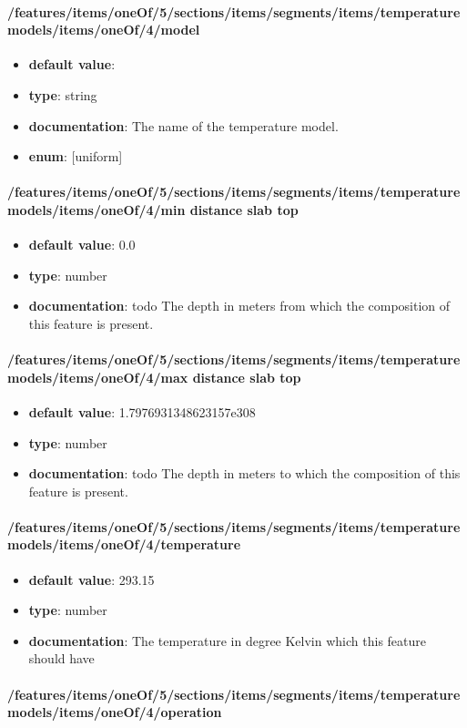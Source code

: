 \paragraph{/features/items/oneOf/5/sections/items/segments/items/temperature models/items/oneOf/4/model}
\begin{itemize}\item {\bf default value}: 
\item {\bf type}: string
\item {\bf documentation}: The name of the temperature model.
\item {\bf enum}: [uniform]\end{itemize}\paragraph{/features/items/oneOf/5/sections/items/segments/items/temperature models/items/oneOf/4/min distance slab top}
\begin{itemize}\item {\bf default value}: 0.0
\item {\bf type}: number
\item {\bf documentation}: todo The depth in meters from which the composition of this feature is present.
\end{itemize}\paragraph{/features/items/oneOf/5/sections/items/segments/items/temperature models/items/oneOf/4/max distance slab top}
\begin{itemize}\item {\bf default value}: 1.7976931348623157e308
\item {\bf type}: number
\item {\bf documentation}: todo The depth in meters to which the composition of this feature is present.
\end{itemize}\paragraph{/features/items/oneOf/5/sections/items/segments/items/temperature models/items/oneOf/4/temperature}
\begin{itemize}\item {\bf default value}: 293.15
\item {\bf type}: number
\item {\bf documentation}: The temperature in degree Kelvin which this feature should have
\end{itemize}\paragraph{/features/items/oneOf/5/sections/items/segments/items/temperature models/items/oneOf/4/operation}

